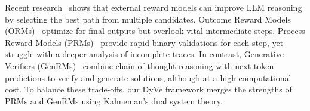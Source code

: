 
Recent research~\cite{setlur2024rewardingprogressscalingautomated,wang2024mathshepherd,guan2025rstar} shows that external reward models can improve LLM reasoning by selecting the best path from multiple candidates. Outcome Reward Models (ORMs)~\cite{cobbe2021ORM,yang2024qwen2.5math} optimize for final outputs but overlook vital intermediate steps. Process Reward Models (PRMs)~\cite{lightman2023lets_verify,zhang2025lessons,wang2024mathshepherd} provide rapid binary validations for each step, yet struggle with a deeper analysis of incomplete traces. In contrast, Generative Verifiers (GenRMs)~\cite{zhang2024generativeverifiersrewardmodeling} combine chain-of-thought reasoning with next-token predictions to verify and generate solutions, although at a high computational cost. To balance these trade-offs, our DyVe framework merges the strengths of PRMs and GenRMs using Kahneman's dual system theory.



